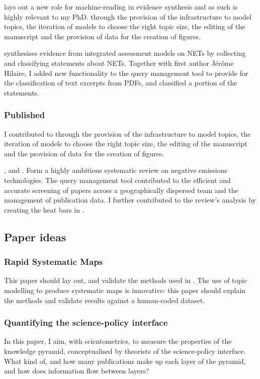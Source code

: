 \documentclass{article}
\begin{document}
\citep{Lamb2018a} lays out a new role for machine-reading in evidence synthesis and as such is highly relevant to my PhD. 
through the provision of the infrastructure to model topics, the iteration of models to choose the right topic size, the editing of the manuscript and the provision of data for the creation of figures.

\citep{Hilaire2018} synthesises evidence from integrated assessment models on NETs by collecting and classifying statements about NETs. Together with first author Jérôme Hilaire, I added new functionality to the query management tool to provide for the classification of text excerpts from PDFs, and classified a portion of the statements.

\subsubsection{Published}

I contributed to \citep{Lamb2018} through the provision of the infrastructure to model topics, the iteration of models to choose the right topic size, the editing of the manuscript and the provision of data for the creation of figures.

\citep{Minx2018}, \citep{Fuss2018} and \citep{Nemet2018}. Form a highly ambitious systematic review on negative emissions technologies. The query management tool contributed to the efficient and accurate screening of papers across a geographically dispersed team and the management of publication data. I further contributed to the review's analysis by creating the heat bars in \citep{Fuss2018}.

\subsection{Paper ideas}

\subsubsection{Rapid Systematic Maps}
This paper should lay out, and validate the methods used in \citep{Lamb2018a}. The use of topic modelling to produce systematic maps is innovative: this paper should explain the methods and validate results against a human-coded dataset.

\subsubsection{Quantifying the science-policy interface}
In this paper, I aim, with scientometrics, to measure the properties of the knowledge pyramid, conceptualised by theorists of the science-policy interface. What kind of, and how many publications make up each layer of the pyramid, and how does information flow between layers?

\linespread{1}




	
\end{document}
